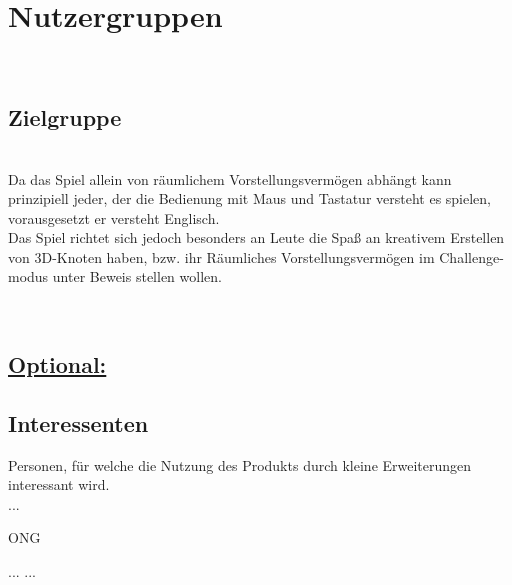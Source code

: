 %
%


\chapter{Nutzergruppen}
\label{NG}~\\


\section{Zielgruppe}
\label{NG:ZG}

~\\
Da das Spiel allein von räumlichem Vorstellungsvermögen abhängt kann prinzipiell jeder, der die Bedienung mit Maus und Tastatur versteht es spielen, vorausgesetzt er versteht Englisch.
\\
Das Spiel richtet sich jedoch besonders an Leute die Spaß an kreativem Erstellen von 3D-Knoten haben, bzw. ihr Räumliches Vorstellungsvermögen im Challenge-modus unter Beweis stellen wollen.

~\\


\section*{\underline{Optional:}}

\section{Interessenten}
\label{NG:Interessenten}

Personen, für welche die Nutzung des Produkts durch kleine Erweiterungen interessant wird.\\

...
\\

\begin{ids}{\gls{ONG}}

	\id[ 11] ...
	\id[100] ...

\end{ids}
